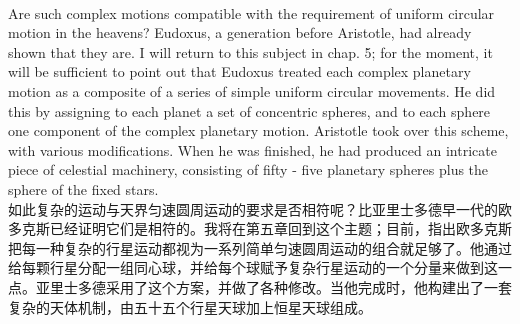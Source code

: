 \documentclass{article}
\begin{document}
\\
Are such complex motions compatible with the requirement of uniform circular motion in the heavens? Eudoxus, a generation before Aristotle, had already shown that they are. I will return to this subject in chap. 5; for the moment, it will be sufficient to point out that Eudoxus treated each complex planetary motion as a composite of a series of simple uniform circular movements. He did this by assigning to each planet a set of concentric spheres, and to each sphere one component of the complex planetary motion. Aristotle took over this scheme, with various modifications. When he was finished, he had produced an intricate piece of celestial machinery, consisting of fifty - five planetary spheres plus the sphere of the fixed stars.\\
如此复杂的运动与天界匀速圆周运动的要求是否相符呢？比亚里士多德早一代的欧多克斯已经证明它们是相符的。我将在第五章回到这个主题；目前，指出欧多克斯把每一种复杂的行星运动都视为一系列简单匀速圆周运动的组合就足够了。他通过给每颗行星分配一组同心球，并给每个球赋予复杂行星运动的一个分量来做到这一点。亚里士多德采用了这个方案，并做了各种修改。当他完成时，他构建出了一套复杂的天体机制，由五十五个行星天球加上恒星天球组成。\\
\end{document}
